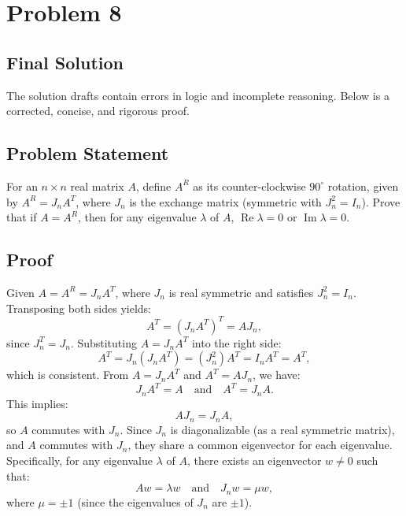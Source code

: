 \documentclass[12pt,a4paper]{article}
\theoremstyle{definition}
\begin{document}
\section{Problem 8}
\subsection{Final Solution}
    The solution drafts contain errors in logic and incomplete reasoning. Below is a corrected, concise, and rigorous proof.

    \subsection*{Problem Statement}
    For an $n \times n$ real matrix $A$, define $A^R$ as its counter-clockwise $90^{\circ}$ rotation, given by $A^R = J_n A^T$, where $J_n$ is the exchange matrix (symmetric with $J_n^2 = I_n$). Prove that if $A = A^R$, then for any eigenvalue $\lambda$ of $A$, $\operatorname{Re} \lambda = 0$ or $\operatorname{Im} \lambda = 0$.

    \subsection*{Proof}
    Given $A = A^R = J_n A^T$, where $J_n$ is real symmetric and satisfies $J_n^2 = I_n$. Transposing both sides yields:
    \[
        A^T = (J_n A^T)^T = A J_n,
    \]
    since $J_n^T = J_n$. Substituting $A = J_n A^T$ into the right side:
    \[
        A^T = J_n (J_n A^T) = (J_n^2) A^T = I_n A^T = A^T,
    \]
    which is consistent. From $A = J_n A^T$ and $A^T = A J_n$, we have:
    \[
        J_n A^T = A \quad \text{and} \quad A^T = J_n A.
    \]
    This implies:
    \[
        A J_n = J_n A,
    \]
    so $A$ commutes with $J_n$. Since $J_n$ is diagonalizable (as a real symmetric matrix), and $A$ commutes with $J_n$, they share a common eigenvector for each eigenvalue. Specifically, for any eigenvalue $\lambda$ of $A$, there exists an eigenvector $w \neq 0$ such that:
    \[
        A w = \lambda w \quad \text{and} \quad J_n w = \mu w,
    \]
    where $\mu = \pm 1$ (since the eigenvalues of $J_n$ are $\pm 1$).
\end{document}
